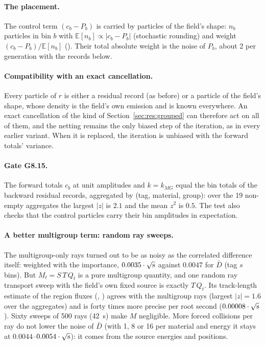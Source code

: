 \paragraph{The placement.} The control term $(c_b-P_b)$ is carried by particles of the field's shape:
$n_b$ particles in bin $b$ with $\mathbb E[n_b]\propto|c_b-P_b|$ (stochastic rounding) and weight
$(c_b-P_b)/\mathbb E[n_b]$ (). Their total absolute weight is
the noise of $P_b$, about 2 per generation with the records below.

\paragraph{Compatibility with an exact cancellation.} Every particle of $\hat r$ is either a residual
record (as before) or a particle of the field's shape, whose density is the field's own emission and
is known everywhere. An exact cancellation of the kind of Section~\ref{sec:res:grouped} can therefore
act on all of them, and the netting remains the only biased step of the iteration, as in every earlier
variant. When it is replaced, the iteration is unbiased with the forward totals' variance.

\paragraph{Gate G8.15.} The forward totals $c_b$ at unit amplitudes and $k=k_{MG}$ equal the bin
totals of the backward residual records, aggregated by (tag, material, group): over the 19 non-empty
aggregates the largest $|z|$ is $2.1$ and the mean $z^2$ is $0.5$. The test
also checks that the control particles carry their bin amplitudes in expectation.

\paragraph{A better multigroup term: random ray sweeps.} The multigroup-only rays turned out to be as
noisy as the correlated difference itself: weighted with the importance, $0.0035\cdot\sqrt{\text s}$
against $0.0047$ for $\bar D$ (tag $s$ bins). But $M_t=S\,T\,Q_t$ is a pure multigroup quantity, and
one random ray transport sweep with the field's own fixed source is exactly $T\,Q_t$. Its
track-length estimate of the region fluxes (,
) agrees with the multigroup rays (largest $|z|=1.6$ over the
aggregates) and is forty times more precise per root second ($0.00008\cdot\sqrt{\text s}$). Sixty sweeps
of 500 rays (42~s) make $M$ negligible. More forced collisions per ray do not lower the noise of
$\bar D$ (with 1, 8 or 16 per material and energy it stays at $0.0044$--$0.0054\cdot\sqrt{\text s}$): it
comes from the source energies and positions.

